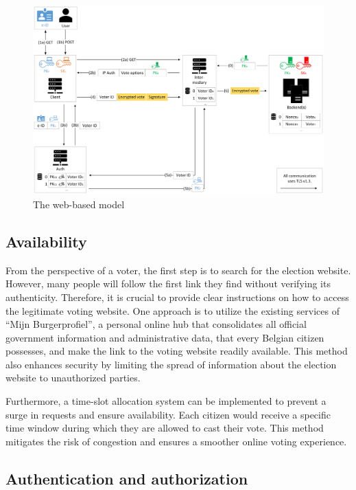 \documentclass[a4paper,12pt,english]{article}
\begin{document}
\begin{figure}
    \centering
    \includegraphics[width=\textwidth]{Schematic}
    \caption{The web-based model}\label{fig:schematic}
\end{figure}

\subsection{Availability}\label{sec:design-availability}

From the perspective of a voter, the first step is to search for the election website. However, many people will follow the first link they find without verifying its authenticity. Therefore, it is crucial to provide clear instructions on how to access the legitimate voting website. One approach is to utilize the existing services of ``Mijn Burgerprofiel'', a personal online hub that consolidates all official government information and administrative data, that every Belgian citizen possesses, and make the link to the voting website readily available. This method also enhances security by limiting the spread of information about the election website to unauthorized parties.

Furthermore, a time-slot allocation system can be implemented to prevent a surge in requests and ensure availability. Each citizen would receive a specific time window during which they are allowed to cast their vote. This method mitigates the risk of congestion and ensures a smoother online voting experience.

\subsection{Authentication and authorization}\label{sec:design-auth}
\end{document}
